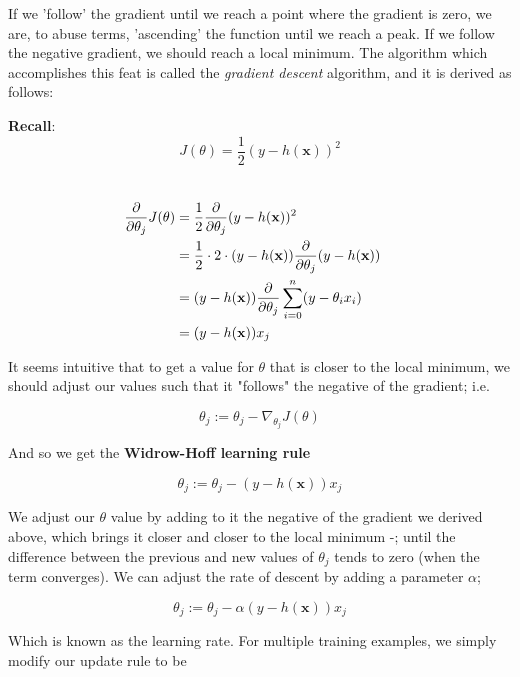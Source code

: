 \documentclass{article}
\begin{document}
If we 'follow' the gradient until we reach a point where the gradient is zero, we are, to abuse terms, 'ascending' the function until we reach a peak. If we follow the negative gradient, we should reach a local minimum. The algorithm which accomplishes this feat is called the \textit{gradient descent} algorithm, and it is derived as follows:

\textbf{Recall}:
\begin{equation}
J(\theta) = \frac{1}{2} (y - h(\textbf{x}))^{2}
\end{equation}

\begin{equation}
\begin{align*} \cr \frac{\partial}{\partial \theta_{j}} J(\theta) &= \frac{1}{2} \frac{\partial}{\partial \theta_{j}} (y - h(\textbf{x}))^{2} \cr &= \frac{1}{2} \cdot 2 \cdot (y - h(\textbf{x})) \frac{\partial}{\partial \theta_{j}} (y - h(\textbf{x})) \cr &= (y - h(\textbf{x})) \frac{\partial}{\partial \theta_{j}} \sum_{i=0}^{n} (y - \theta_{i}x_{i}) \cr &= (y - h(\textbf{x})) x_{j} \end{align*}
\end{equation}

It seems intuitive that to get a value for \( \theta \) that is closer to the local minimum, we should adjust our values such that it "follows" the negative of the gradient; i.e.

\begin{equation}
\theta_{j} := \theta_{j} - \nabla_{\theta_{j}} J(\theta)
\end{equation}

And so we get the \textbf{Widrow-Hoff learning rule}

\begin{equation}
\theta_{j} := \theta_{j} - (y - h(\textbf{x})) x_{j}
\end{equation}

We adjust our \(\theta\) value by adding to it the negative of the gradient we derived above, which brings it closer and closer to the local minimum -; until the difference between the previous and new values of \(\theta_{j}\) tends to zero (when the term converges). We can adjust the rate of descent by adding a parameter \(\alpha\);

\begin{equation}
\theta_{j} := \theta_{j} - \alpha(y - h(\textbf{x})) x_{j}
\end{equation}

Which is known as the learning rate. For multiple training examples, we simply modify our update rule to be
\end{document}
